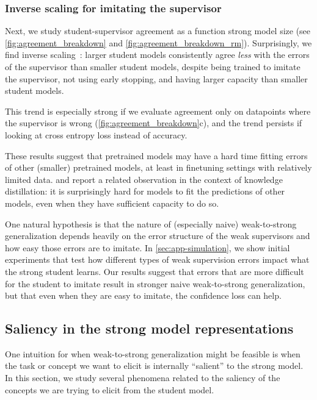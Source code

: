 \subsubsection{Inverse scaling for imitating the supervisor}
\label{subsec:emulating-weak}

Next, we study student-supervisor agreement as a function strong model size (see \ref{fig:agreement_breakdown} and \ref{fig:agreement_breakdown_rm}). Surprisingly, we find inverse scaling~\citep{mckenzie2023inverse}: larger student models consistently agree \emph{less} with the errors of the supervisor than smaller student models, despite being trained to imitate the supervisor, not using early stopping, and having larger capacity than smaller student models. 

This trend is especially strong if we evaluate agreement only on datapoints where the supervisor is wrong (\ref{fig:agreement_breakdown}c), and the trend persists if looking at cross entropy loss instead of accuracy.  

These results suggest that pretrained models may have a hard time fitting errors of other (smaller) pretrained models, at least in finetuning settings with relatively limited data. 
\citet{stanton2021does} and \citet{furlanello2018born} report a related observation in the context of knowledge distillation: it is surprisingly hard for models to fit the predictions of other models, even when they have sufficient capacity to do so.

One natural hypothesis is that the nature of (especially naive) weak-to-strong generalization depends heavily on the error structure of the weak supervisors and how easy those errors are to imitate. In \ref{sec:app-simulation}, we show initial experiments that test how different types of weak supervision errors impact what the strong student learns. Our results suggest that errors that are more difficult for the student to imitate result in stronger naive weak-to-strong generalization, but that even when they are easy to imitate, the confidence loss can help.

\subsection{Saliency in the strong model representations}
\label{sec:salience}

One intuition for when weak-to-strong generalization might be feasible is when the task or concept we want to elicit is internally ``salient'' to the strong model. In this section, we study several phenomena related to the saliency of the concepts we are trying to elicit from the student model.

